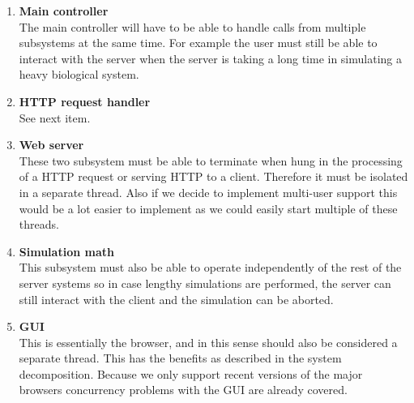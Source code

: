 \begin{enumerate}
\item \textbf{Main controller} \\
The main controller will have to be able to handle calls from multiple subsystems at the same time. For example the user must still be able to interact with the server when the server is taking a long time in simulating a heavy biological system.\item \textbf{HTTP request handler} \\
See next item.
\item \textbf{Web server} \\
These two subsystem must be able to terminate when hung in the processing of a HTTP request or serving HTTP to a client. Therefore it must be isolated in a separate thread. Also if we decide to implement multi-user support this would be a lot easier to implement as we could easily start multiple of these threads. 
\item \textbf{Simulation math} \\
This subsystem must also be able to operate independently of the rest of the server systems so in case lengthy simulations are performed, the server can still interact with the client and the simulation can be aborted.
\item \textbf{GUI} \\
This is essentially the browser, and in this sense should also be considered a separate thread. This has the benefits as described in the system decomposition. Because we only support recent versions of the major browsers concurrency problems with the GUI are already covered.\end{enumerate}
